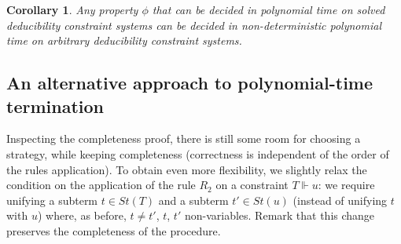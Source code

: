 \documentclass[acmtocl,acmnow]{acmtrans2m}
\newtheorem{corollary}[theorem]{Corollary}
\newcommand{\st}{\mathit{St}}
\newcommand{\dedsyss}[1]{deducibility constraint systems}
\begin{document}
\begin{corollary}\label{corol:general}
Any property $\phi$ that can be decided
in polynomial time on solved \dedsyss{} can be decided in non-deterministic polynomial
time on arbitrary \dedsyss{}.
\end{corollary}


























































































\subsection{An alternative approach to polynomial-time termination}
\label{section:strategy}


Inspecting the completeness proof, there is still some room for choosing a
strategy, while keeping completeness (correctness is independent
of the order of the rules application). 
To obtain even more flexibility, we slightly relax the condition on
the application of the rule $R_2$ on a constraint $T\Vdash u$: we
require unifying a subterm $t\in\st(T)$ and a subterm $t'\in\st(u)$
(instead of unifying $t$ with $u$) where, as before, $t\neq t'$, $t$,
$t'$ non-variables.  Remark that this change preserves the
completeness of the procedure.
\end{document}
